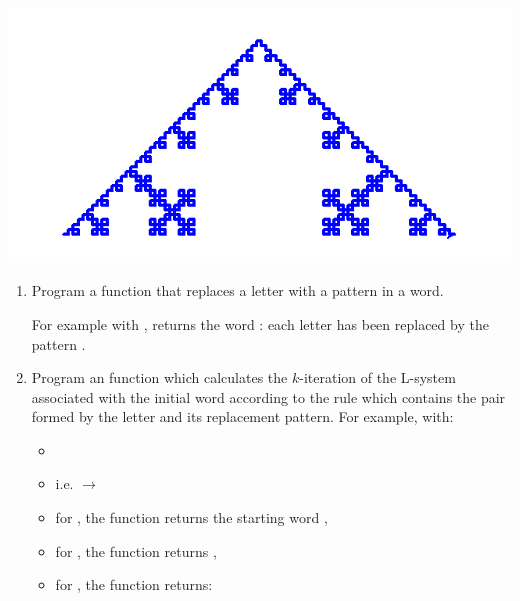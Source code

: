 \documentclass[11pt,class=report,crop=false]{standalone}
\begin{document}
\begin{activite}



\begin{center}
\includegraphics[scale=\myscale,scale=0.4]{screen-lsystems-2}
\end{center}

\begin{enumerate}
  \item Program a  function that replaces a letter with a pattern in a word. 

For example with ,  returns the word : each letter  has been replaced by the pattern .
 
  \item Program an  function
  which calculates the $k$-iteration of the L-system associated with the initial word  according to the rule  which contains the pair formed by the letter and its replacement pattern.
  For example, with:
  \begin{itemize}
    \item {}
    \item {} i.e.  $\rightarrow$ 
    \item for , the function returns the starting word ,
    \item for , the function returns ,
    \item for , the function returns:  
     

\end{itemize}
\end{enumerate}
\end{activite}
\end{document}
